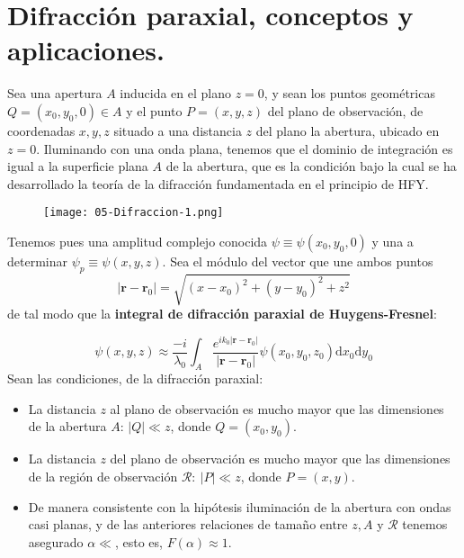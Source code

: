 \documentclass[12pt,a4paper]{book}
\numberwithin{equation}{section}
\numberwithin{figure}{section}
\newcommand{\D}{\mathrm{d}}
\newcommand{\1}{_{(1)}}
\newcommand{\2}{_{(2)}}
\newcommand{\rn}{\mathbf{r}}
\theoremstyle{definition}
\begin{document}
\section{Difracción paraxial, conceptos y aplicaciones.}

Sea una apertura $A$ inducida en el plano $z=0$, y sean los puntos geométricas $Q=(x_0,y_0,0) \in A$ y el punto $P=(x,y,z)$ del plano de observación, de coordenadas $x,y,z$ situado a una distancia $z$ del plano la abertura, ubicado en $z=0$. Iluminando con una onda plana, tenemos que el dominio de integración es igual a la superficie plana $A$ de la abertura, que es la condición bajo la cual se ha desarrollado la teoría de la difracción fundamentada en el principio de HFY. \\ 

\begin{figure}
    \centering
    \texttt{[image: 05-Difraccion-1.png]}
    \caption{}
    \label{Fig:05.3-1}
\end{figure}

Tenemos pues una amplitud complejo conocida $\psi\equiv\psi(x_0,y_0,0)$ y una a determinar $\psi_p \equiv \psi(x,y,z)$. Sea el módulo del vector que une ambos puntos $$|\rn-\rn_0|= \sqrt{(x-x_0)^2+(y-y_0)^2+z^2}$$ de tal modo que la \textbf{integral de difracción paraxial de Huygens-Fresnel}:

\begin{equation}
    \psi (x,y,z) \approx \frac{-i}{\lambda_0} \int_A \frac{e^{ik_0|\rn-\rn_0|}}{|\rn-\rn_0|} \psi (x_0,y_0,z_0) \D x_0 \D y_0 \label{Ec:05.03-01}
\end{equation}
Sean las condiciones, de la difracción paraxial: \\

\begin{itemize}
    \item La distancia $z$ al plano de observación es mucho mayor que las dimensiones de la abertura $A$: $|Q|\ll z$, donde $Q=(x_0,y_0)$. 
    \item La distancia $z$ del plano de observación es mucho mayor que las dimensiones de la región de observación $\mathcal{R}: \ |P|\ll z$, donde $P=(x,y)$. 
    \item De manera consistente con la hipótesis iluminación de la abertura con ondas casi planas, y de las anteriores relaciones de tamaño entre $z,A$ y $\mathcal{R}$ tenemos asegurado $\alpha \ll$, esto es, $F(\alpha)\approx 1$.
\end{itemize}
\end{document}
